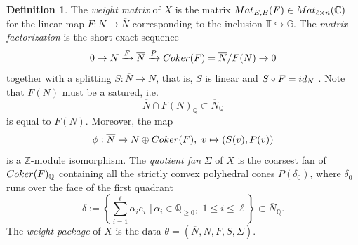 \documentclass[11pt, reqno]{amsart}
\theoremstyle{plain}
\theoremstyle{definition}
\newtheorem{definition}[theorem]{Definition}
\theoremstyle{remark}
\begin{document}
\begin{definition}\label{def-weightpack}
The \emph{weight matrix} of  $X$ is the matrix
${\rm Mat}_{E, B}(F)\in {\rm Mat}_{\ell\times n}(\mathbb{C})$
for the linear map $F: N\rightarrow \overline{N}$ corresponding to the inclusion $\mathbb{T}\hookrightarrow \mathbb{G}$. The \emph{matrix factorization} is the short exact sequence 
$$0\rightarrow N\xrightarrow{F} \overline{N}\xrightarrow{P} {\rm Coker}(F) =  \overline{N}/F(N)\rightarrow 0 $$
together with a splitting $S:\overline{N}\rightarrow N$, that is, $S$ is linear and $S\circ F = {\rm id}_{N}$ . Note that $F(N)$ must be a satured, i.e.
$$\overline{N}\cap F(N)_{\mathbb{Q}}\subset \overline{N}_{\mathbb{Q}}$$ 
is equal to $F(N)$.
Moreover, the map
\begin{equation}\label{Eq:downgraded}
    \phi:\overline{N}\rightarrow N\oplus {\rm Coker}(F),\,\, v\mapsto (S(v), P(v))
\end{equation}
is a $\mathbb{Z}$-module isomorphism. The \emph{quotient fan} $\Sigma$ of $X$ is the coarsest fan of ${\rm Coker}(F)_{\mathbb{Q}}$ containing all the strictly convex polyhedral cones $P(\delta_0)$, where $\delta_{0}$ runs over the face of the 
first quadrant 
$$ \delta:= \left\{ \sum_{i = 1}^{\ell}\alpha_{i} e_{i}\, \, |\, \alpha_{i}\in \mathbb{Q}_{\geq 0}, \,\, 1\leq i\leq \ell\right\}\subset \overline{N}_{\mathbb{Q}}.$$
The \emph{weight package} of $X$ is the data $\theta =  (\overline{N}, N, F, S, \Sigma)$.
\end{definition}
\end{document}
